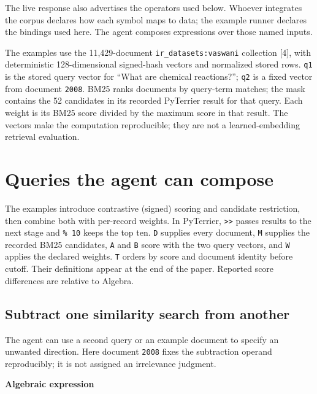 \documentclass{article}
\begin{document}
The live response also advertises the operators used below. Whoever integrates the corpus declares how each symbol maps to data; the example runner declares the bindings used here. The agent composes expressions over those named inputs.

The examples use the 11,429-document \texttt{ir\_datasets:vaswani} collection {[}4{]}, with deterministic 128-dimensional signed-hash vectors and normalized stored rows. \texttt{q1} is the stored query vector for “What are chemical reactions?”; \texttt{q2} is a fixed vector from document \texttt{2008}. BM25 ranks documents by query-term matches; the mask contains the 52 candidates in its recorded PyTerrier result for that query. Each weight is its BM25 score divided by the maximum score in that result. The vectors make the computation reproducible; they are not a learned-embedding retrieval evaluation.

\newpage

\hypertarget{queries-the-agent-can-compose}{%
\section{Queries the agent can compose}\label{queries-the-agent-can-compose}}

The examples introduce contrastive (signed) scoring and candidate restriction, then combine both with per-record weights. In PyTerrier, \texttt{>>} passes results to the next stage and \texttt{\% 10} keeps the top ten. \texttt{D} supplies every document, \texttt{M} supplies the recorded BM25 candidates, \texttt{A} and \texttt{B} score with the two query vectors, and \texttt{W} applies the declared weights. \texttt{T} orders by score and document identity before cutoff. Their definitions appear at the end of the paper. Reported score differences are relative to Algebra.

\hypertarget{subtract-one-similarity-search-from-another}{%
\subsection{Subtract one similarity search from another}\label{subtract-one-similarity-search-from-another}}

The agent can use a second query or an example document to specify an unwanted direction. Here document \texttt{2008} fixes the subtraction operand reproducibly; it is not assigned an irrelevance judgment.

\textbf{Algebraic expression}
\end{document}
